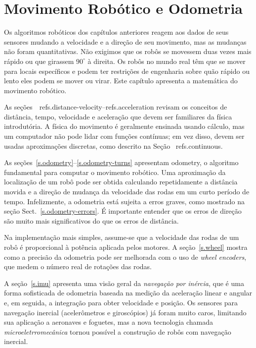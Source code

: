 
\chapter{Movimento Robótico e Odometria}\label{ch.motion}

Os algoritmos robóticos dos capítulos anteriores reagem aos dados de seus sensores mudando a velocidade e a direção de seu movimento, mas as mudanças não foram quantitativas. Não exigimos que os robôs se movessem duas vezes mais rápido ou que girassem $90^\circ$ à direita. Os robôs no mundo real têm que se mover para locais específicos e podem ter restrições de engenharia sobre quão rápido ou lento eles podem se mover ou virar. Este capítulo apresenta a matemática do movimento robótico.

As seções~~ref{s.distance-velocity}--ref{s.acceleration} revisam os conceitos de distância, tempo, velocidade e aceleração que devem ser familiares da física introdutória. A física do movimento é geralmente ensinada usando cálculo, mas um computador não pode lidar com funções contínuas; em vez disso, devem ser usadas aproximações discretas, como descrito na Seção ~ref{s.continuous}.

As seções~\ref{s.odometry}--\ref{s.odometry-turns} apresentam {odometry}, o algoritmo fundamental para computar o movimento robótico. Uma aproximação da localização de um robô pode ser obtida calculando repetidamente a distância movida e a direção de mudança da velocidade das rodas em um curto período de tempo. Infelizmente, a odometria está sujeita a erros graves, como mostrado na seção Sect.~\ref{s.odometry-errors}. É importante entender que os erros de direção são muito mais significativos do que os erros de distância.

Na implementação mais simples, assume-se que a velocidade das rodas de um robô é proporcional à potência aplicada pelos motores. A seção~\ref{s.wheel} mostra como a precisão da odometria pode ser melhorada com o uso de \emph{wheel encoders}, que medem o número real de rotações das rodas.

A seção~\ref{s.imu} apresenta uma visão geral da \emph{navegação por inércia}, que é uma forma sofisticada de odometria baseada na medição da aceleração linear e angular e, em seguida, a integração para obter velocidade e posição. Os sensores para navegação inercial (acelerômetros e giroscópios) já foram muito caros, limitando sua aplicação a aeronaves e foguetes, mas a nova tecnologia chamada \emph{microeletrromecânica} tornou possível a construção de robôs com navegação inercial.

